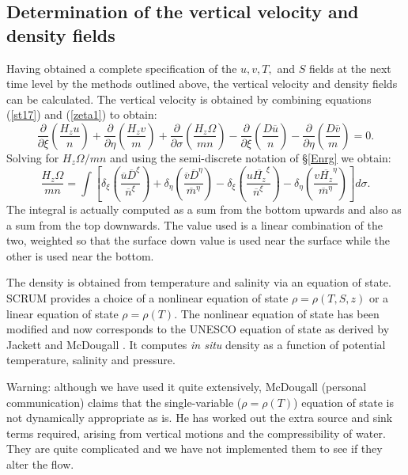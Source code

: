 \subsection{Determination of the vertical velocity and density fields}
\label{EOS}
Having obtained a complete specification of the $u,v,T,$ and $S$ fields
at the next time level by the methods outlined above, the vertical
velocity and density fields can be calculated.  The vertical velocity
is obtained by combining equations (\ref{st17}) and (\ref{zeta1}) to
obtain:
\begin{equation}
   \frac{\partial}{\partial \xi} \left( \frac{H_z u}{n} \right) +
   \frac{\partial}{\partial \eta} \left( \frac{H_z v}{m} \right) +
   \frac{\partial}{\partial \sigma}\left( \frac{H_z \Omega}{mn} \right)
   - \frac{\partial}{\partial \xi} \left( \frac{D \overline{u}}{n}
   \right) -
   \frac{\partial}{\partial \eta} \left( \frac{D \overline{v}}{m}
   \right)  = 0 .
\label{zeta2}
\end{equation}
Solving for $H_z \Omega / mn$ and using the semi-discrete notation of
\S\ref{Enrg} we obtain:
\begin{equation}
   \frac{H_z \Omega}{mn} =  \int  \left[
   \delta_{\xi} \left( \frac{\overline{u} \overline{D}^{\xi}}
   {\overline{n}^{\xi}} \right) +
   \delta_{\eta} \left( \frac{\overline{v} \overline{D}^{\eta}}
   {\overline{m}^{\eta}} \right) -
   \delta_{\xi} \left( \frac{u \overline{H_z}^{\xi}}
   {\overline{n}^{\xi}} \right) - 
   \delta_{\eta} \left( \frac{v \overline{H_z}^{\eta}}
   {\overline{m}^{\eta}} \right)  \right] d\sigma .
\label{omega}
\end{equation}
The integral is actually computed as a sum from the bottom upwards and
also as a sum from the top downwards.  The value used is a linear
combination of the two, weighted so that the surface down value is used
near the surface while the other is used near the bottom.

The density is obtained from temperature and salinity via an
equation of state.  SCRUM provides a choice of a nonlinear equation
of state $\rho = \rho(T,S,z)$ or a linear equation of state $\rho =
\rho(T)$.  The nonlinear equation of state has been modified and now
corresponds to the UNESCO equation of state as derived by Jackett and
McDougall \cite{Jackett}.  It computes {\sl in situ} density as a
function of potential temperature, salinity and pressure.

Warning: although we have used it quite extensively, McDougall
(personal communication) claims that the single-variable ($\rho =
\rho(T)$) equation of state is not dynamically appropriate as is.
He has worked out the extra source and sink terms required, arising
from vertical motions and the compressibility of water.  They are
quite complicated and we have not implemented them to see if they
alter the flow.

